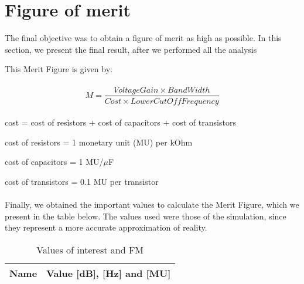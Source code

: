 \section{Figure of merit}
\label{sec:results}

The final objective was to obtain a figure of merit as high as possible. 
In this section, we present the final result, after we performed all the analysis

This Merit Figure is given by:
\paragraph{}

\begin{equation}
    M = \frac{VoltageGain \times BandWidth}{Cost \times LowerCutOffFrequency}  
\end{equation}

\paragraph{}

cost = cost of resistors + cost of capacitors + cost of transistors

cost of resistors = 1 monetary unit (MU) per kOhm

cost of capacitors = 1 MU/$\mu$F

cost of transistors = 0.1 MU per transistor

\paragraph{}

Finally, we obtained the important values to calculate the Merit Figure, which we present in the table below. The values used were those of the simulation, since they represent a more accurate approximation of reality.


\vspace{0.3in}
\begin{table}[ht]
  \centering
  \begin{tabular}{|l|r|}
    \hline    
    {\bf Name} & {\bf Value [dB], [Hz] and [MU]} \\ \hline
    
  \end{tabular}
  \caption{Values of interest and FM}
  \label{tab:op1z}
\end{table}


